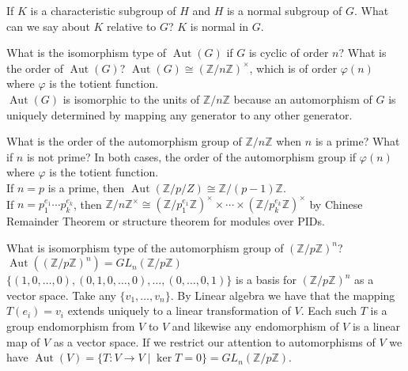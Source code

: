 \documentclass[avery5371,grid]{flashcards}
\newcommand{\Z}{\mathbb{Z}}
\DeclareMathOperator{\Aut}{Aut}
\let \phi \varphi
\begin{document}
\begin{flashcard}[Groups]{If $K$ is a characteristic subgroup of $H$ and $H$ is a normal subgroup of $G$. What can we say about $K$ relative to $G$?}
 $K$ is normal in $G$.
\end{flashcard} 

\begin{flashcard}[Groups]{What is the isomorphism type of $\Aut(G)$ if $G$ is cyclic of order $n$? What is the order of $\Aut(G)$?}
 $\Aut(G) \cong (\Z/n\Z)^\times$, which is of order $\phi(n)$ where $\phi$ is the totient function.\\
 
 $\Aut(G)$ is isomorphic to the units of $\Z/n\Z$ because an automorphism of $G$ is uniquely determined by mapping any generator to any other generator.
\end{flashcard}

\begin{flashcard}[Groups]{What is the order of the automorphism group of $\Z/n\Z$ when $n$ is a prime? What if $n$ is not prime?}
 In both cases, the order of the automorphism group if $\phi(n)$ where $\phi$ is the totient function. \\
 
 If $n = p$ is a prime, then $\Aut(\Z/p/Z) \cong \Z/(p-1)\Z$.\\
 
 If $n = p_1^{e_1} \cdots p_k^{e_k}$, then $\Z/n\Z^\times \cong (\Z/p_1^{e_1} \Z)^\times  \times \cdots \times (\Z/p_k^{e_k} \Z)^\times$ by Chinese Remainder Theorem or structure theorem for modules over PIDs.
\end{flashcard}

\begin{flashcard}[Groups]{What is isomorphism type of the automorphism group of $(\Z/p\Z)^n$?}
 $\Aut((\Z/p\Z)^n) = GL_n(\Z/p\Z)$ \\
 
 $\{ (1, 0, \ldots, 0), (0, 1, 0, \ldots, 0), \ldots, (0, \ldots, 0, 1) \}$ is a basis for $(\Z/p\Z)^n$  as a vector space. Take any $\{v_1, \ldots , v_n\}$. By Linear algebra we have that the mapping $T(e_i) = v_i$ extends uniquely to a linear transformation of $V$. Each such $T$ is a group endomorphism from $V$ to $V$ and likewise any endomorphism of $V$ is a linear map of $V$ as a vector space. If we restrict our attention to automorphisms of $V$ we have $\Aut(V) = \{ T : V \to V \mid \ker T = 0 \} = GL_n(\Z/p\Z)$.
\end{flashcard}
\end{document}
